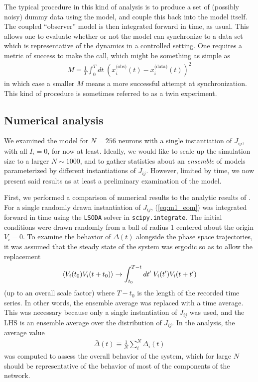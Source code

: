 \documentclass{article} %
\begin{document}
The typical procedure in this kind of analysis is to produce a set of (possibly noisy) dummy data using the model, and couple this back into the model itself.  The coupled ``observer'' model is then integrated forward in time, as usual. This allows one to evaluate whether or not the model can synchronize to a data set which is representative of the dynamics in a controlled setting.  One requires a metric of success to make the call, which might be something as simple as
\begin{align}
	M = \frac{1}{T} \int_0^T dt \; \left(x_i^\text{(obs)}(t) - x_i^\text{(data)}(t)\right)^2
\end{align}
in which case a smaller $M$ means a more successful attempt at synchronization.  This kind of procedure is sometimes referred to as a twin experiment.

\subsection{Numerical analysis}
We examined the model for $N=256$ neurons with a single instantiation of $J_{ij}$, with all $I_i=0$, for now at least.  Ideally, we would like to scale up the simulation size to a larger $N \sim 1000$, and to gather statistics about an \emph{ensemble} of models parameterized by different instantiations of $J_{ij}$.  However, limited by time, we now present said results as at least a preliminary examination of the model.

First, we performed a comparison of numerical results to the analytic results of \cite{Sompolinsky1988}.  For a single randomly drawn instantiation of $J_{ij}$, (\ref{eq:m1_eom}) was integrated forward in time using the \texttt{LSODA} solver in \texttt{scipy.integrate}.  The initial conditions were drawn randomly from a ball of radius 1 centered about the origin $V_i=0$.  To examine the behavior of $\Delta(t)$ alongside the phase space trajectories, it was assumed that the steady state of the system was ergodic so as to allow the replacement
\begin{align*}
	\left\langle V_i(t_0)V_i(t+t_0) \right\rangle \rightarrow \int_{t_0}^{T-t} dt^{\prime} \; V_i(t^{\prime}) V_i(t+t^{\prime})
\end{align*}
(up to an overall scale factor) where $T-t_0$ is the length of the recorded time series.  In other words, the ensemble average was replaced with a time average.  This was necessary because only a single instantiation of $J_{ij}$ was used, and the LHS is an ensemble average over the distribution of $J_{ij}$.  In the analysis, the average value
\begin{align}
	\bar{\Delta}(t) \equiv \frac{1}{N} \sum_i^N \Delta_i(t)
\end{align}
was computed to assess the overall behavior of the system, which for large $N$ should be representative of the behavior of most of the components of the network.
\end{document}

